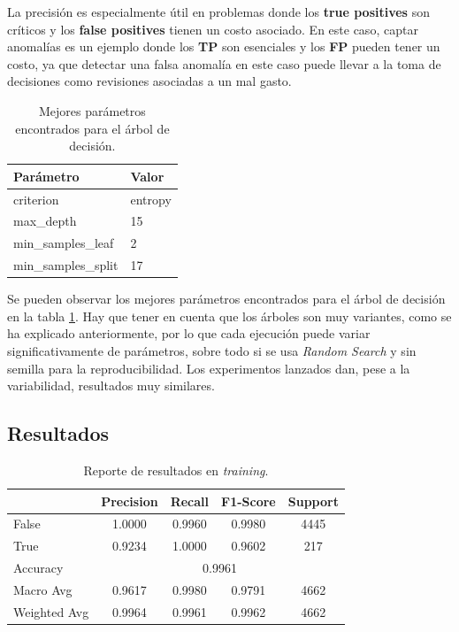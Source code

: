 \documentclass[12pt,letterpaper]{article}
\begin{document}
La precisión es especialmente útil en problemas donde los \textbf{true positives} son críticos y los \textbf{false positives} tienen un costo asociado. En este caso, captar anomalías es un ejemplo donde los \textbf{TP} son esenciales y los \textbf{FP} pueden tener un costo, ya que detectar una falsa anomalía en este caso puede llevar a la toma de decisiones como revisiones asociadas a un mal gasto.

\begin{table}[htp]
    \centering
    \begin{tabular}{ll}
        \hline
        \textbf{Parámetro} & \textbf{Valor} \\ \hline
        criterion & entropy \\ 
        max\_depth & 15 \\ 
        min\_samples\_leaf & 2 \\ 
        min\_samples\_split & 17 \\ \hline
    \end{tabular}
    \caption{Mejores parámetros encontrados para el árbol de decisión.}
    \label{tab:hyper_param_decision_tree}
\end{table}

Se pueden observar los mejores parámetros encontrados para el árbol de decisión en la tabla \ref{tab:hyper_param_decision_tree}. Hay que tener en cuenta que los árboles son muy variantes, como se ha explicado anteriormente, por lo que cada ejecución puede variar significativamente de parámetros, sobre todo si se usa \textit{Random Search} y sin semilla para la reproducibilidad. Los experimentos lanzados dan, pese a la variabilidad, resultados muy similares.

\subsection{Resultados}

\begin{table}[htp]
    \centering
    \begin{tabular}{lcccc}
        \hline
        & \textbf{Precision} & \textbf{Recall} & \textbf{F1-Score} & \textbf{Support} \\ \hline
        False & 1.0000 & 0.9960 & 0.9980 & 4445 \\
        True & 0.9234 & 1.0000 & 0.9602 & 217 \\ \hline
        Accuracy & \multicolumn{4}{c}{0.9961} \\
        Macro Avg & 0.9617 & 0.9980 & 0.9791 & 4662 \\
        Weighted Avg & 0.9964 & 0.9961 & 0.9962 & 4662 \\ \hline
    \end{tabular}
    \caption{Reporte de resultados en \textit{training}.}
    \label{tab:results_decision_tree_training}
\end{table}
\end{document}
